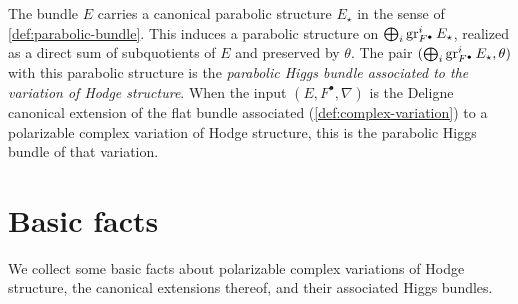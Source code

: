 \begin{definition}
  The bundle \(E\) carries a canonical parabolic structure \(E_\star\) in the sense
  of \cref{def:parabolic-bundle}. This induces a parabolic structure on
  \(\bigoplus_i \operatorname{gr}^i_{F^\bullet} E_\star\), realized as a direct sum of
  subquotients of \(E\) and preserved by \(\theta\). The pair
  \((\bigoplus_i \operatorname{gr}^i_{F^\bullet} E_\star, \theta)\) with this parabolic structure
  is the \emph{parabolic Higgs bundle associated to the variation of Hodge
  structure}. When the input \((E, F^\bullet, \nabla)\) is the Deligne canonical
  extension of the flat bundle associated (\cref{def:complex-variation}) to a
  polarizable complex variation of Hodge structure, this is the parabolic Higgs
  bundle of that variation.
\end{definition}

\section{Basic facts}

We collect some basic facts about polarizable complex variations of Hodge
structure, the canonical extensions thereof, and their associated Higgs bundles.

